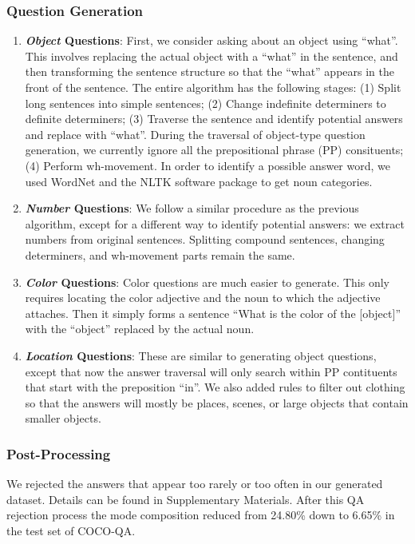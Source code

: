 \documentclass{article}
\renewcommand{\#}[1]{\textbf{#1}}
\begin{document}
\subsubsection{Question Generation}
\begin{enumerate}[leftmargin=*]
\item \textbf{{\it Object} Questions}:
First, we consider asking about an object using ``what''. This involves 
replacing the actual object with a ``what'' in the sentence, and then 
transforming the sentence structure so that the ``what'' appears in the 
front of the sentence. The entire algorithm has the following stages: (1)
Split long sentences into simple sentences; (2) Change indefinite determiners 
to definite determiners; (3) Traverse the sentence and identify potential answers and replace 
with ``what''. During the traversal of object-type question generation, 
we currently ignore all the prepositional phrase (PP) consituents;
(4) Perform wh-movement.
In order to identify a possible answer word, we used WordNet \cite{wordnet}
and the NLTK software package \cite{nltk} to get noun categories.

\item \textbf{{\it Number} Questions}:
We follow a similar procedure as the 
previous algorithm, except for a different way to identify potential answers:
we extract numbers from original sentences. Splitting 
compound sentences, changing determiners, and wh-movement parts remain the same.

\item \textbf{{\it Color} Questions}:
Color questions are much easier to generate. This only requires locating the 
color adjective and the noun to which the adjective attaches. Then it simply 
forms a sentence ``What is the color of the [object]'' with the ``object'' 
replaced by the actual noun.

\item \textbf{{\it Location} Questions}:
These are similar to generating object questions, except that now the answer
traversal will only search within PP contituents that start with the 
preposition ``in''. We also added rules to filter out clothing so that the 
answers will mostly be places, scenes, or large objects that contain 
smaller objects.
\end{enumerate}

\subsubsection{Post-Processing}
We rejected 
the answers that appear too rarely or too often in our generated
dataset. Details can be found in Supplementary Materials. After
this QA rejection process the mode composition reduced from 24.80\% 
down to 6.65\% in the test set of COCO-QA. 
\end{document}
